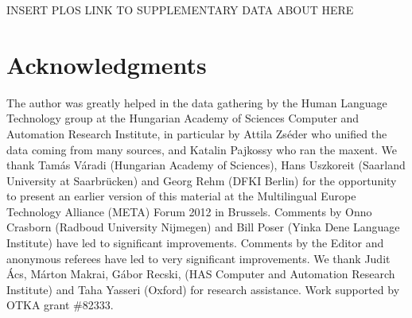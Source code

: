 \documentclass[10pt]{article}
\begin{document}
INSERT PLOS LINK TO SUPPLEMENTARY DATA ABOUT HERE


\section*{Acknowledgments}

The author was greatly helped in the data gathering by the Human Language
Technology group at the Hungarian Academy of Sciences Computer and Automation
Research Institute, in particular by Attila Zs\'eder who unified the data
coming from many sources, and Katalin Pajkossy who ran the maxent.  We thank
Tam\'as V\'aradi (Hungarian Academy of Sciences), Hans Uszkoreit (Saarland
University at Saarbr\"ucken) and Georg Rehm (DFKI Berlin) for the opportunity
to present an earlier version of this material at the Multilingual Europe
Technology Alliance (META) Forum 2012 in Brussels. Comments by Onno Crasborn
(Radboud University Nijmegen) and Bill Poser (Yinka Dene Language Institute)
have led to significant improvements. {\color{black} Comments by the Editor and
  anonymous referees have led to very significant improvements.}  We thank
Judit \'Acs, M\'arton Makrai, G\'abor Recski, (HAS Computer and Automation
Research Institute) and Taha Yasseri (Oxford) for research assistance.  Work
supported by OTKA grant \#82333.

%



\end{document}
